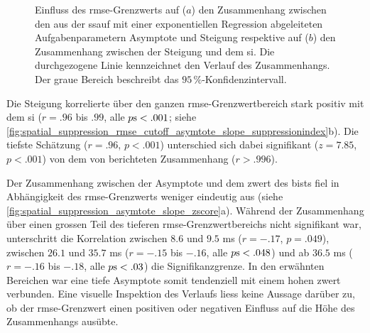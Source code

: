 \documentclass[11pt, twoside, a4paper]{book}		%
\begin{document}
\begin{figure}[htbp]
	\centering
	\begin{adjustbox}{width=1\textwidth}
	\end{adjustbox}
	\newline
	\begin{adjustbox}{width=1\textwidth}
	\end{adjustbox}
	\caption[Einfluss des \gls{rmse}-Grenzwerts der \gls{ssauf} auf den Zusammenhang zwischen der Asymptote, der Steigung und dem \gls{si}]{Einfluss des \gls{rmse}-Grenzwerts auf ($a$) den Zusammenhang zwischen den aus der \gls{ssauf} mit einer exponentiellen Regression abgeleiteten Aufgabenparametern Asymptote und Steigung respektive auf ($b$) den Zusammenhang zwischen der Steigung und dem \gls{si}. Die durchgezogene Linie kennzeichnet den Verlauf des Zusammenhangs. Der graue Bereich beschreibt das $95\,\%$-Konfidenzintervall.}
	\label{fig:spatial_suppression_rmse_cutoff_asymtote_slope_suppressionindex}
\end{figure}

Die Steigung korrelierte über den ganzen \gls{rmse}-Grenzwertbereich stark positiv mit dem \gls{si} ($r=.96$ bis $.99$, alle $p\textnormal{s}<.001$; siehe \autoref{fig:spatial_suppression_rmse_cutoff_asymtote_slope_suppressionindex}b). Die tiefste Schätzung ($r=.96$, $p<.001$) unterschied sich dabei signifikant ($z=7.85$, $p<.001$) von dem von \citet{Melnick2013} berichteten Zusammenhang ($r>.996$).

Der Zusammenhang zwischen der Asymptote und dem \gls{zwert} des \gls{bist}s fiel in Abhängigkeit des \gls{rmse}-Grenzwerts weniger eindeutig aus (siehe \autoref{fig:spatial_suppression_asymtote_slope_zscore}a).
Während der Zusammenhang über einen grossen Teil des tieferen \gls{rmse}-Grenzwertbereichs nicht signifikant war, unterschritt die Korrelation zwischen $8.6$ und $9.5$ ms ($r = -.17$, $p = .049$), zwischen $26.1$ und $35.7$ ms ($r = -.15$ bis $ -.16$, alle $p\textnormal{s} < .048$) und ab $36.5$ ms ($r = -.16$ bis $-.18$, alle $p\textnormal{s} < .03$) die Signifikanzgrenze. In den erwähnten Bereichen war eine tiefe Asymptote somit tendenziell mit einem hohen \gls{zwert} verbunden. Eine visuelle Inspektion des Verlaufs liess keine Aussage darüber zu, ob der  \gls{rmse}-Grenzwert einen positiven oder negativen Einfluss auf die Höhe des Zusammenhangs ausübte.
\end{document}
